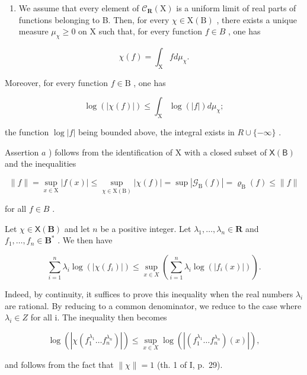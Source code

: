 \begin{enumerate}
\def\labelenumi{\alph{enumi})}
\setcounter{enumi}{2}
\tightlist
\item
  We assume that every element of \(\mathcal{C}_{\mathbf{R}}(\mathrm{X})\) is a uniform limit of real parts of functions belonging to B. Then, for every \(\chi \in \mathrm{X}(\mathrm{B})\) , there exists a unique measure \(\mu_{\chi} \geqslant 0\) on X such that, for every function \(f \in B\) , one has
\end{enumerate}

\[
\chi (f) = \int_ {\mathrm{X}} f d \mu_ {\chi}.
\]

Moreover, for every function \(f \in \mathrm{B}\) , one has

\[
\log (| \chi (f) |) \leqslant \int_ {\mathrm{X}} \log (| f |) d \mu_ {\chi};
\]

the function \(\log|f|\) being bounded above, the integral exists in \(R \cup \{-\infty\}\) .

Assertion \(a\) ) follows from the identification of X with a closed subset of \(\mathsf{X}(\mathsf{B})\) and the inequalities

\[
\| f \| = \sup _ {x \in \mathrm{X}} | f (x) | \leqslant \sup _ {\chi \in \mathrm{X} (\mathrm{B})} | \chi (f) | = \sup | \mathcal {G} _ {\mathrm{B}} (f) | = \varrho_ {\mathrm{B}} (f) \leqslant \| f \|
\]

for all \(f \in B\) .

Let \(\chi \in \mathsf{X}(\mathbf{B})\) and let \(n\) be a positive integer. Let \(\lambda_1, \ldots, \lambda_n \in \mathbf{R}\) and \(f_1, \ldots, f_n \in \mathbf{B}^*\) . We then have

\[
\sum_ {i = 1} ^ {n} \lambda_ {i} \log (| \chi (f _ {i}) |) \leqslant \sup _ {x \in X} \left(\sum_ {i = 1} ^ {n} \lambda_ {i} \log (| f _ {i} (x) |)\right).\tag{1}
\]

Indeed, by continuity, it suffices to prove this inequality when the real numbers \(\lambda_{i}\) are rational. By reducing to a common denominator, we reduce to the case where \(\lambda_{i} \in Z\) for all i. The inequality then becomes

\[
\log \left(\left| \chi \left(f _ {1} ^ {\lambda_ {1}} \dots f _ {n} ^ {\lambda_ {n}}\right) \right|\right) \leqslant \sup _ {x \in X} \log \left(\left| \left(f _ {1} ^ {\lambda_ {1}} \dots f _ {n} ^ {\lambda_ {n}}\right) (x) \right|\right),
\]

and follows from the fact that \(\|\chi\|=1\) (th. 1 of I, p.~29).

